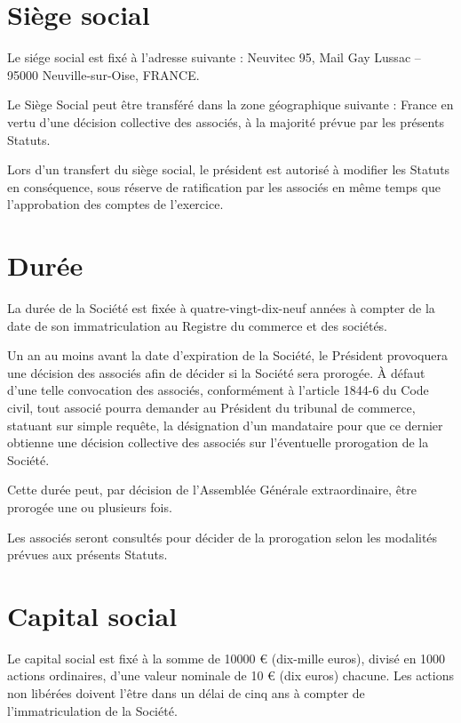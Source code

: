 \documentclass[a4paper,12pt]{report}
\newcommand{\address}{Neuvitec 95, Mail Gay Lussac -- 95000 Neuville-sur-Oise, FRANCE}
\begin{document}
\section{Siège social}
Le siége social est fixé à l'adresse suivante : \address. 

Le Siège Social peut être transféré dans la zone géographique suivante : France en vertu d'une décision collective des associés, à la majorité prévue par les présents Statuts.

Lors d'un transfert du siège social, le président est autorisé à modifier les Statuts en conséquence, sous réserve de ratification par les associés en même temps que l'approbation des comptes de l'exercice.


\section{Durée}
La durée de la Société est fixée à quatre-vingt-dix-neuf années à compter de la date de son immatriculation au Registre du commerce et des sociétés.

Un an au moins avant la date d'expiration de la Société, le Président provoquera une décision des associés afin de décider si la Société sera prorogée. 
À défaut d'une telle convocation des associés, conformément à l'article 1844-6 du Code civil, tout associé pourra demander au Président du tribunal de commerce, 
statuant sur simple requête, la désignation d'un mandataire pour que ce dernier obtienne une décision collective des associés sur l'éventuelle prorogation de la Société.

Cette durée peut, par décision de l'Assemblée Générale extraordinaire, être prorogée une ou plusieurs fois.

Les associés seront consultés pour décider de la prorogation selon les modalités prévues aux présents Statuts.

\section{Capital social}
Le capital social est fixé à la somme de 10000 € (dix-mille euros), divisé en 1000 actions ordinaires,
d'une valeur nominale de 10 € (dix euros) chacune.
Les actions non libérées doivent l'être dans un délai de cinq ans à compter de l'immatriculation de la Société.
\end{document}
